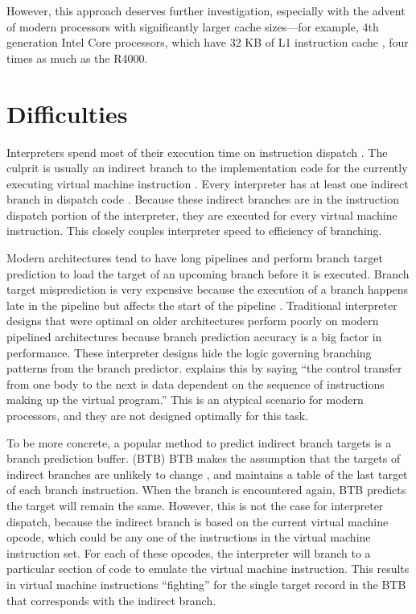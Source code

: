 		However, this approach deserves further investigation, especially with the advent of modern processors with significantly larger cache sizes---for example, 4th generation Intel Core processors, which have 32 KB of L1 instruction cache \citep{haswellarch}, four times as much as the R4000.
	
	\section{Difficulties}
		Interpreters spend most of their execution time on instruction dispatch \citep{modernarchvm}. The culprit is usually an indirect branch to the implementation code for the currently executing virtual machine instruction \citep{optimizingindirectbranch}. Every interpreter has at least one indirect branch in dispatch code \citep{modernarchvm}. Because these indirect branches are in the instruction dispatch portion of the interpreter, they are executed for every virtual machine instruction. This closely couples interpreter speed to efficiency of branching.
		
		Modern architectures tend to have long pipelines and perform branch target prediction to load the target of an upcoming branch before it is executed. Branch target misprediction is very expensive because the execution of a branch happens late in the pipeline but affects the start of the pipeline \citep{optimizingindirectbranch}. Traditional interpreter designs that were optimal on older architectures perform poorly on modern pipelined architectures because branch prediction accuracy is a big factor in performance. These interpreter designs hide the logic governing branching patterns from the branch predictor. \cite{yeti} explains this by saying ``the control transfer from one body to the next is data dependent on the sequence of instructions making up the virtual program.'' This is an atypical scenario for modern processors, and they are not designed optimally for this task.
		
		To be more concrete, a popular method to predict indirect branch targets is a branch prediction buffer. (BTB) BTB makes the assumption that the targets of indirect branches are unlikely to change \citep{yeti}, and maintains a table of the last target of each branch instruction. When the branch is encountered again, BTB predicts the target will remain the same. However, this is not the case for interpreter dispatch, because the indirect branch is based on the current virtual machine opcode, which could be any one of the instructions in the virtual machine instruction set. For each of these opcodes, the interpreter will branch to a particular section of code to emulate the virtual machine instruction. This results in virtual machine instructions ``fighting'' for the single target record in the BTB that corresponds with the indirect branch.
		
